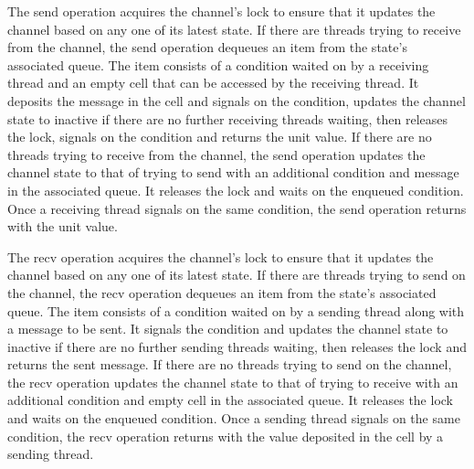 \documentclass{article}
\begin{document}
The send operation acquires the channel's lock to ensure that it updates the channel based on
any one of its latest state.  If there are threads trying to receive from the channel, the send
operation dequeues an item from the state's associated queue.  The item consists of a condition
waited on by a receiving thread and an empty cell that can be accessed by the receiving thread.
It deposits the message in the cell and signals on the condition, updates the channel state to
inactive if there are no further receiving threads waiting, then releases the lock, signals on
the condition and returns the unit value.  If there are no threads trying to receive from the
channel, the send operation updates the channel state to that of trying to send with an
additional condition and message in the associated queue.  It releases the lock and waits on
the enqueued condition.  Once a receiving thread signals on the same condition, the send
operation returns with the unit value.

The recv operation acquires the channel's lock to ensure that it updates the channel based on
any one of its latest state.  If there are threads trying to send on the channel, the recv
operation dequeues an item from the state's associated queue.  The item consists of a condition
waited on by a sending thread along with a message to be sent.  It signals the condition and
updates the channel state to inactive if there are no further sending threads waiting, then
releases the lock and returns the sent message.  If there are no threads trying to send on the
channel, the recv operation updates the channel state to that of trying to receive with an
additional condition and empty cell in the associated queue.  It releases the lock and waits on
the enqueued condition.  Once a sending thread signals on the same condition, the recv
operation returns with the value deposited in the cell by a sending thread.
\end{document}
